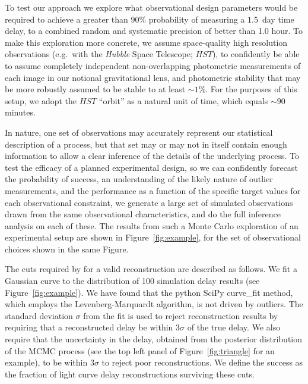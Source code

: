 \documentclass{emulateapj}
\begin{document}
To test our approach we explore what observational design parameters
would be required to achieve a greater than 90\% probability of
measuring a $1.5$~day time delay, to a combined random and systematic
precision of better than 1.0 hour. To make this exploration more
concrete, we assume space-quality high resolution observations (e.g.\
with the \emph{Hubble} Space Telescope; $HST$), to confidently be able
to assume completely independent non-overlapping photometric
measurements of each image in our notional gravitational lens, and
photometric stability that may be more robustly assumed to be stable
to at least $\sim1\%$.  For the purposes of this setup, we adopt the
$HST$ ``orbit'' as a natural unit of time, which equals
$\sim90$\,minutes.


In nature, one set of observations may accurately represent our
statistical description of a process, but that set may or may not in
itself contain enough information to allow a clear inference of the
details of the underlying process. To test the efficacy of a planned
experimental design, so we can confidently forecast the probability of
success, an understanding of the likely nature of outlier
measurements, and the performance as a function of the specific
target values for each observational constraint, we generate a large
set of simulated observations drawn from the same observational
characteristics, and do the full inference analysis on each of these.
The results from such a Monte Carlo exploration of an experimental
setup are shown in Figure~\ref{fig:example}, for the set of
observational choices shown in the same Figure. 

The cuts required by for a valid reconstruction are described as follows. 
We fit a Gaussian curve to the distribution of 100 simulation delay results (see Figure~\ref{fig:example}). 
We have found that the python SciPy curve\_fit method, which employs the
Levenberg-Marquardt algorithm, is not driven by outliers. The standard
deviation $\sigma$ from the fit is used to reject reconstruction
results by requiring that a reconstructed delay be within 3$\sigma$ of
the true delay. We also require that the uncertainty in the delay, 
obtained from the posterior distribution of the MCMC process (see the top left 
panel of Figure~\ref{fig:triangle} for an example), to be
within 3$\sigma$ to reject poor reconstructions. We define the success as the 
fraction of light curve delay reconstructions surviving these cuts.
\end{document}

